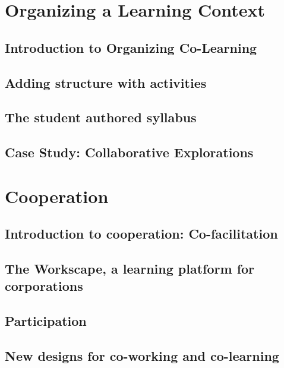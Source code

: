 \documentclass[ebook,12pt, twoside]{memoir}
\begin{document}
\part{Organizing a Learning Context} \label{organizing-part} %
%
\chapter[\textbf{Organizing Co-Learning}]{Introduction to Organizing Co-Learning}

%
\chapter[\textbf{Adding structure}]{Adding structure with activities}
%

%
\chapter[\textbf{The student authored syllabus}]{ The student authored syllabus } 
%

%
\chapter[\textbf{Case Study: Collaborative Explorations}]{ Case Study: Collaborative Explorations}
%


\part{Cooperation} \label{cooperation-part} %
%
\chapter[\textbf{Co-facilitation}]{Introduction to cooperation: Co-facilitation}

%
\chapter[\textbf{The Workscape}]{ The Workscape, a learning platform for corporations }
%

\chapter[\textbf{Participation}]{ Participation }
%

%
\chapter[\textbf{Designs for co-working}]{New designs for co-working and co-learning}
%

%
\end{document}
